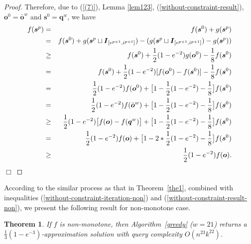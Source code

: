 \documentclass[preprint,12pt]{elsarticle}
\newtheorem{theorem}{Theorem}
\def\bea{\begin{eqnarray}}
\def\eea{\end{eqnarray}}
\def\endzm{\hfill $\Box$ \bigskip}
\def\bo{\boldsymbol{o}}
\def\bs{\boldsymbol{s}}
\def\bq{\boldsymbol{q}}
\def\bI{\boldsymbol{I}}
\begin{document}
\begin{proof}
Therefore, due to (\ref{(7)}),  Lemma \ref{lem123}, (\ref{without-constraint-result}), $\bo^0=\bar{\bo}^w$ and $\bs^0=\bq^w$,  we have
\bea
f(\bs^{p}) \notag
&=& f(\bs^0)+g(\bs^{p}) \\ \notag
&=& f(\bs^0)+g(\bs^{p}\sqcup\bI_{[e^{p+1}, i^{p+1}]})-(g(\bs^{p}\sqcup\bI_{[e^{p+1}, i^{p+1}]})-g(\bs^{p})) \\ \notag
&\ge& f(\bs^0)+\frac{1}{2}(1-e^{-2})g(\bo^0)-\frac{1}{8}f(\bs^0) \\ \notag
&=& f(\bs^0)+\frac{1}{2}(1-e^{-2})[f(\bo^0)-f(\bs^0)]-\frac{1}{8}f(\bs^0) \\ \notag
&=& \frac{1}{2}(1-e^{-2})f(\bo^0) + \big[ 1-\frac{1}{2}(1-e^{-2})-\frac{1}{8} \big] f(\bs^0) \\ \notag
&=& \frac{1}{2}(1-e^{-2})f(\bar{\bo}^w) + \big[ 1-\frac{1}{2}(1-e^{-2})-\frac{1}{8} \big] f(\bs^0) \\ \notag
&\ge& \frac{1}{2}(1-e^{-2}) \big[ f(\bo)-f(\bq^w) \big] + \big[ 1-\frac{1}{2}(1-e^{-2})-\frac{1}{8} \big] f(\bs^0) \\ \notag
&=& \frac{1}{2}(1-e^{-2})f(\bo) + \big[ 1-2*\frac{1}{2}(1-e^{-2})-\frac{1}{8} \big] f(\bs^0) \\ \notag
&\ge& \frac{1}{2}(1-e^{-2})f(\bo).
\eea
\endzm
\end{proof}


According to the similar process as that in Theorem~\ref{the1}, combined with inequalities  (\ref{without-constraint-iteration-non}) and (\ref{without-constraint-result-non}), we present the  following result for non-monotone case.
\begin{theorem}
If $f$ is non-monotone, then Algorithm~\ref{greedy} ($w=21$) returns a $\frac{1}{3}(1-e^{-3})$-approximation solution with query complexity $O(n^{23}k^{22})$.
\end{theorem}
\end{document}
